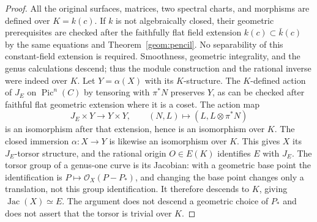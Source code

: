 \begin{proof}
All the original surfaces, matrices, two spectral charts, and
morphisms are defined over $K=k(c)$.  If $k$ is not algebraically
closed, their geometric prerequisites are checked after the
faithfully flat field extension $k(c)\subset\bar k(c)$ by the same
equations and Theorem~\ref{geom:pencil}.  No separability of this
constant-field extension is required.  Smoothness, geometric
integrality, and the genus calculations descend; thus the module
construction and the rational inverse were indeed over $K$.
Let $Y=\alpha(X)$ with its $K$-structure.  The $K$-defined action
of $J_E$ on $\operatorname{Pic}^n(C)$ by tensoring with $\pi^*N$
preserves $Y$, as can be checked after faithful flat geometric
extension where it is a coset.  The action map
\[
J_E\times Y\longrightarrow Y\times Y,
\qquad(N,L)\longmapsto(L,L\otimes\pi^*N)
\]
is an isomorphism after that extension, hence is an isomorphism
over $K$.  The closed immersion $\alpha:X\to Y$ is likewise an
isomorphism over $K$.  This gives $X$ its $J_E$-torsor structure,
and the rational origin $O\in E(K)$ identifies $E$ with $J_E$.
The torsor group of a genus-one curve is its Jacobian: with a
geometric base point the identification is
$P\mapsto\mathcal O_X(P-P_*)$, and changing the base point changes
only a translation, not this group identification.  It therefore
descends to $K$, giving $\operatorname{Jac}(X)\simeq E$.
The argument does not descend a geometric choice of $P_*$ and does
not assert that the torsor is trivial over $K$.
\end{proof}
